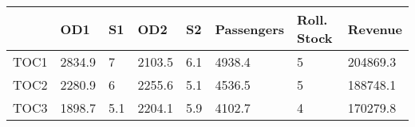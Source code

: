 \begin{tabular}{llllllll}
& OD1 & S1 & OD2 & S2 & Passengers & Roll. Stock & Revenue \\ 
\hline 
TOC1 & 2834.9 & 7 & 2103.5 & 6.1 & 4938.4 & 5 & 204869.3 \\ 
TOC2 & 2280.9 & 6 & 2255.6 & 5.1 & 4536.5 & 5 & 188748.1 \\ 
TOC3 & 1898.7 & 5.1 & 2204.1 & 5.9 & 4102.7 & 4 & 170279.8 \\ 
\hline 
\end{tabular}